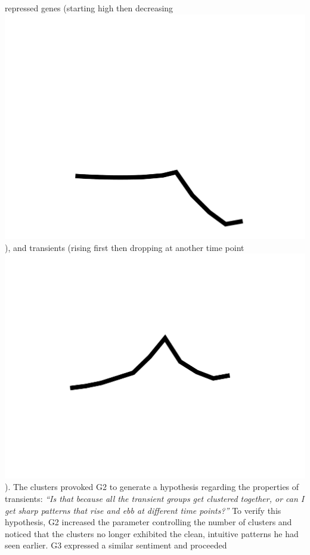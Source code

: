  repressed genes (starting high then decreasing \includegraphics[width=2\baselineskip,keepaspectratio]{figures/down.pdf}),
 and transients (rising first then dropping at another time point \includegraphics[width=2\baselineskip,keepaspectratio]{figures/updown.pdf}). The clusters provoked G2 to generate a hypothesis
 regarding the properties of transients:
 \textit{``Is that because all the transient groups
 get clustered together, or can I get sharp patterns
 that rise and ebb at different time points?''}
 To verify this hypothesis, G2 increased the parameter controlling the number of clusters and noticed that the clusters
 no longer exhibited the clean,
 intuitive patterns he had seen earlier.
 G3 expressed a similar sentiment and proceeded
